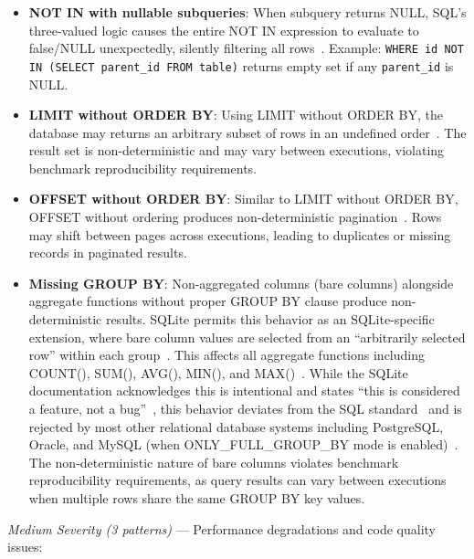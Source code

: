 \documentclass[]{einformatica}
\begin{document}
\begin{itemize}
\item \textbf{NOT IN with nullable subqueries}: When subquery returns NULL, SQL's three-valued logic causes the entire NOT IN expression to evaluate to false/NULL unexpectedly, silently filtering all rows~\cite{karwin2010sqlantipatterns,date2012sqlrelational}. Example: \texttt{WHERE id NOT IN (SELECT parent\_id FROM table)} returns empty set if any \texttt{parent\_id} is NULL.

\item \textbf{LIMIT without ORDER BY}: Using LIMIT without ORDER BY, the database may returns an arbitrary subset of rows in an undefined order~\cite{karwin2010sqlantipatterns,iso9075_2_2016}. The result set is non-deterministic and may vary between executions, violating benchmark reproducibility requirements.

\item \textbf{OFFSET without ORDER BY}: Similar to LIMIT without ORDER BY, OFFSET without ordering produces non-deterministic pagination~\cite{karwin2010sqlantipatterns,iso9075_2_2016}. Rows may shift between pages across executions, leading to duplicates or missing records in paginated results.

\item \textbf{Missing GROUP BY}: Non-aggregated columns (bare columns) alongside aggregate functions without proper GROUP BY clause produce non-deterministic results. SQLite permits this behavior as an SQLite-specific extension, where bare column values are selected from an ``arbitrarily selected row'' within each group~\cite{sqliteBareColumns}. This affects all aggregate functions including COUNT(), SUM(), AVG(), MIN(), and MAX()~\cite{sqliteBareColumns}. While the SQLite documentation acknowledges this is intentional and states ``this is considered a feature, not a bug''~\cite{sqliteBareColumns}, this behavior deviates from the SQL standard~\cite{iso9075_2_2016} and is rejected by most other relational database systems including PostgreSQL, Oracle, and MySQL (when ONLY\_FULL\_GROUP\_BY mode is enabled)~\cite{postgresGroupBy,mysqlGroupByHandling}. The non-deterministic nature of bare columns violates benchmark reproducibility requirements, as query results can vary between executions when multiple rows share the same GROUP BY key values.
\end{itemize}

\textit{Medium Severity (3 patterns)} --- Performance degradations and code quality issues:
\end{document}
